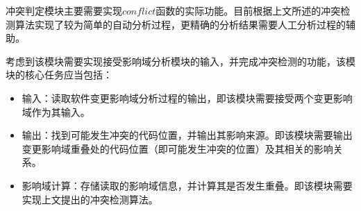 冲突判定模块主要需要实现$conflict$函数的实际功能。目前根据上文所述的冲突检测算法实现了较为简单的自动分析过程，更精确的分析结果需要人工分析过程的辅助。

%
%

考虑到该模块需要实现接受影响域分析模块的输入，并完成冲突检测的功能，该模块的核心任务应当包括：
\begin{itemize}
	\item 输入：读取软件变更影响域分析过程的输出，即该模块需要接受两个变更影响域作为其输入。
	\item 输出：找到可能发生冲突的代码位置，并输出其影响来源。即该模块需要输出变更影响域重叠处的代码位置（即可能发生冲突的位置）及其相关的影响关系。
	\item 影响域计算：存储读取的影响域信息，并计算其是否发生重叠。即该模块需要实现上文提出的冲突检测算法。
\end{itemize}



